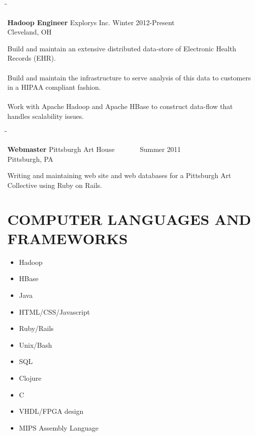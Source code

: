 \documentclass{res}
\begin{document}
\begin{resume}
\begin{tabbing}
   \hspace{2.3in}\= \hspace{2.6in}\= \kill %

    {\bf Hadoop Engineer} \>Explorys Inc.     \>Winter
    2012-Present\\

                             \>Cleveland, OH

   \end{tabbing}\vspace{-20pt}      %

    Build and maintain an extensive distributed data-store of Electronic Health
    Records (EHR). 
\\\\
Build and maintain the infrastructure to serve analysis of this data
to customers in a HIPAA compliant fashion.
\\\\
    Work with Apache Hadoop and Apache HBase to construct data-flow
    that handles scalability issues.

   \begin{tabbing}

   \hspace{2.3in}\= \hspace{2.6in}\= \kill %

    {\bf  Webmaster } \>Pittsburgh Art House\> ~~~~~~
    Summer 2011\\

                          \>Pittsburgh, PA

   \end{tabbing}\vspace{-20pt}

Writing and maintaining web site and web databases for a Pittsburgh
Art Collective using Ruby on Rails.    

\section{COMPUTER LANGUAGES AND FRAMEWORKS}          
\begin{multicols}{2}
  \begin{itemize}
        \item Hadoop
        \item HBase
        \item Java
        \item HTML/CSS/Javascript
        \item Ruby/Rails
        \item Unix/Bash
        \item SQL
        \item Clojure
        \item C
        \item VHDL/FPGA design
        \item MIPS Assembly Language
   \end{itemize}
\end{multicols}


\end{resume}
\end{document}
